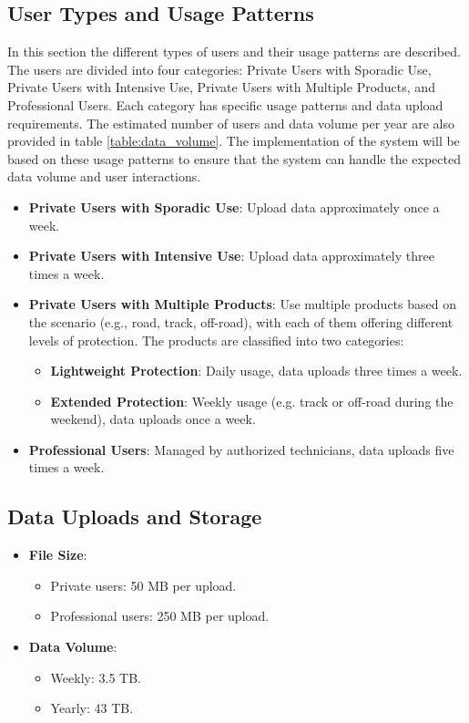 \subsection{User Types and Usage Patterns}
In this section the different types of users and their usage patterns are described. The users are divided into four categories: Private Users with Sporadic Use, Private Users with Intensive Use, Private Users with Multiple Products, and Professional Users. Each category has specific usage patterns and data upload requirements. The estimated number of users and data volume per year are also provided in table \ref{table:data_volume}. The implementation of the system will be based on these usage patterns to ensure that the system can handle the expected data volume and user interactions.
\begin{itemize}
    \item \textbf{Private Users with Sporadic Use}: Upload data approximately once a week.
    \item \textbf{Private Users with Intensive Use}: Upload data approximately three times a week.
    \item \textbf{Private Users with Multiple Products}: Use multiple products based on the scenario (e.g., road, track, off-road), with each of them offering different levels of protection. The products are classified into two categories:
    \begin{itemize}
        \item \textbf{Lightweight Protection}: Daily usage, data uploads three times a week.
        \item \textbf{Extended Protection}: Weekly usage (e.g. track or off-road during the weekend), data uploads once a week.
    \end{itemize}
    \item \textbf{Professional Users}: Managed by authorized technicians, data uploads five times a week.
\end{itemize}

\subsection*{Data Uploads and Storage}
\begin{itemize}
    \item \textbf{File Size}:
    \begin{itemize}
        \item Private users: 50 MB per upload.
        \item Professional users: 250 MB per upload.
    \end{itemize}
    \item \textbf{Data Volume}:
    \begin{itemize}
        \item Weekly: 3.5 TB.
        \item Yearly: 43 TB.
    \end{itemize}
\end{itemize}

